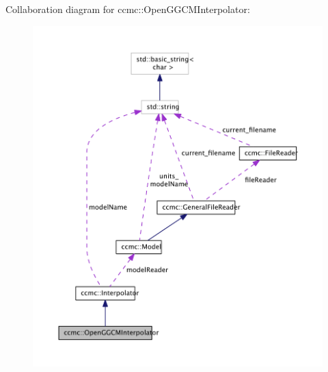 Collaboration diagram for ccmc\-:\-:Open\-G\-G\-C\-M\-Interpolator\-:\nopagebreak
\begin{figure}[H]
\begin{center}
\leavevmode
\includegraphics[width=350pt]{classccmc_1_1_open_g_g_c_m_interpolator__coll__graph}
\end{center}
\end{figure}
